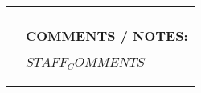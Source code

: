 \documentclass[12pt]{article}
\newcommand{\checkbox}[1]{$#1$}
\begin{document}
\begin{tabular}{|p{}|p{}|}
\begin{minipage}[t]{0.68\textwidth}
    \\
\end{minipage}
&
\begin{minipage}[t]{0.26\textwidth}
\vspace{1em}
\textbf{COMMENTS / NOTES:}

$STAFF_COMMENTS$

\vspace{4em} %

\end{minipage}\\
\hline
\end{tabular}
\end{document}

